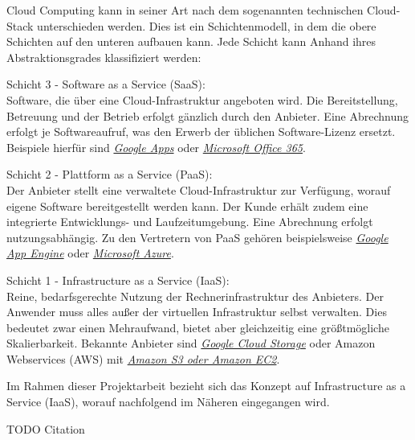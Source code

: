 \documentclass[13pt,a4paper,bibliography=totocnumbered,listof=totocnumbered]{scrartcl}
\begin{document}
Cloud Computing kann in seiner Art nach dem sogenannten technischen Cloud-Stack unterschieden werden. Dies ist ein Schichtenmodell, in dem die obere Schichten auf den unteren aufbauen kann. Jede Schicht kann Anhand ihres Abstraktionsgrades klassifiziert werden:

\begin{compactitem}
\item Schicht 3 - Software as a Service (SaaS):\\
Software, die über eine Cloud-Infrastruktur angeboten wird. Die Bereitstellung, Betreuung und der Betrieb erfolgt gänzlich durch den Anbieter. Eine Abrechnung erfolgt je Softwareaufruf, was den Erwerb der üblichen Software-Lizenz ersetzt. Beispiele hierfür sind \href{http://www.google.com/enterprise/apps/business/}{\textit{Google Apps}} oder \href{http://office.microsoft.com/de-de/business/was-ist-office-365-fur-unternehmen-FX102997580.aspx}{\textit{Microsoft Office 365}}.
\item Schicht 2 - Plattform as a Service (PaaS):\\
Der Anbieter stellt eine verwaltete Cloud-Infrastruktur zur Verfügung, worauf eigene Software bereitgestellt werden kann. Der Kunde erhält zudem eine integrierte Entwicklungs- und Laufzeitumgebung. Eine Abrechnung erfolgt nutzungsabhängig. Zu den Vertretern von PaaS gehören beispielsweise \href{https://cloud.google.com/appengine/}{\textit{Google App Engine}} oder \href{http://azure.microsoft.com/de-de/}{\textit{Microsoft Azure}}.
\item Schicht 1 - Infrastructure as a Service (IaaS):\\
Reine, bedarfsgerechte Nutzung der Rechnerinfrastruktur des Anbieters. Der Anwender muss alles außer der virtuellen Infrastruktur selbst verwalten. Dies bedeutet zwar einen Mehraufwand, bietet aber gleichzeitig eine größtmögliche Skalierbarkeit. Bekannte Anbieter sind \href{https://cloud.google.com/storage/}{\textit{Google Cloud Storage}} oder Amazon Webservices (AWS) mit \href{http://aws.amazon.com/de/}{\textit{Amazon S3 oder Amazon EC2}}.
\end{compactitem}

Im Rahmen dieser Projektarbeit bezieht sich das Konzept auf Infrastructure as a Service (IaaS), worauf nachfolgend im Näheren eingegangen wird.

TODO Citation
\end{document}
